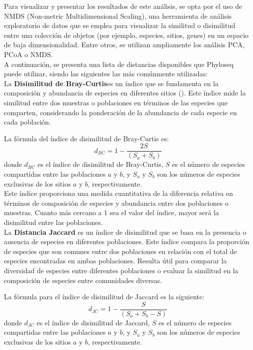 Para visualizar y presentar los resultados de este análisis, se opta por el uso de NMDS (Non-metric Multidimensional Scaling), una herramienta de análisis exploratorio de datos que se emplea para visualizar la similitud o disimilitud entre una colección de objetos (por ejemplo, especies, sitios, genes) en un espacio de baja dimensionalidad. Entre otros, se utilizan ampliamente los análisis PCA, PCoA o NMDS.\\

A continuación, se presenta una lista de distancias disponibles que Phyloseq puede utilizar, siendo las siguientes las más comúnmente utilizadas:\\

La \textbf{Disimilitud de Bray-Curtis}es un índice que se fundamenta en la composición y abundancia de especies en diferentes sitios (\cite{bray&curtis1957}). Este índice mide la similitud entre dos muestras o poblaciones en términos de las especies que comparten, considerando la ponderación de la abundancia de cada especie en cada población.

La fórmula del índice de disimilitud de Bray-Curtis es:
$$d_{BC} = 1 - \frac{2S}{(S_{a} + S_{b})}$$
donde $d_{BC}$ es el índice de disimilitud de Bray-Curtis, $S$ es el número de especies compartidas entre las poblaciones $a$ y $b$, y $S_{a}$ y $S_{b}$ son los números de especies exclusivas de los sitios $a$ y $b$, respectivamente.\\

Este índice proporciona una medida cuantitativa de la diferencia relativa en términos de composición de especies y abundancia entre dos poblaciones o muestras. Cuanto más cercano a 1 sea el valor del índice, mayor será la disimilitud entre las poblaciones.\\

La \textbf{Distancia Jaccard} es un índice de disimilitud que se basa en la presencia o ausencia de especies en diferentes poblaciones. Este índice compara la proporción de especies que son comunes entre dos poblaciones en relación con el total de especies encontradas en ambas poblaciones. Resulta útil para comparar la diversidad de especies entre diferentes poblaciones o evaluar la similitud en la composición de especies entre comunidades diversas.

La fórmula para el índice de disimilitud de Jaccard es la siguiente:
$$d_{JC} = 1 - \frac{S}{(S_{a} + S_{b}-S)}$$
donde $d_{JC}$ es el índice de disimilitud de Jaccard, $S$ es el número de especies compartidas entre las poblaciones $a$ y $b$, y $S_{a}$ y $S_{b}$ son los números de especies exclusivas de los sitios $a$ y $b$, respectivamente.\\

